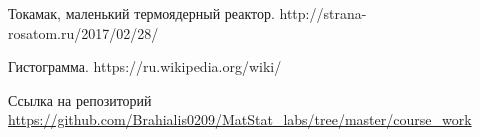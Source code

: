 \documentclass[a4paper,12pt]{article} %
\begin{document}
	
	\tableofcontents \newpage
	 \newpage
	
	\begin{thebibliography}{99}
		 Токамак, маленький термоядерный реактор. http://strana-rosatom.ru/2017/02/28/%
		
		 Гистограмма. https://ru.wikipedia.org/wiki/%
		
		 Ссылка на репозиторий \url{https://github.com/Brahialis0209/MatStat_labs/tree/master/course_work}
 
	\end{thebibliography}
	
\end{document}
